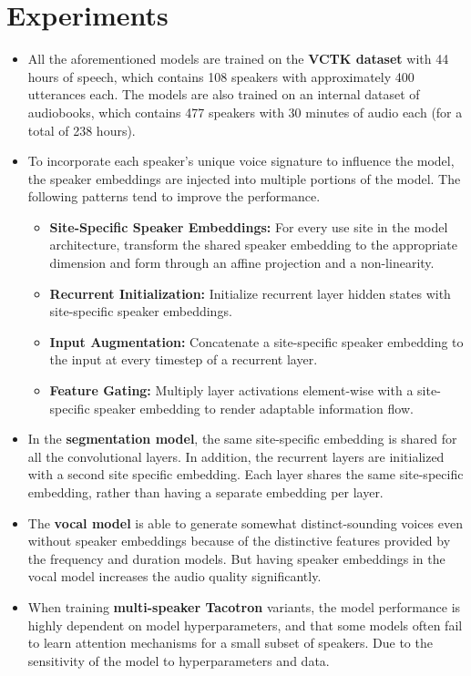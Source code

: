 \documentclass[twosided]{article}
\begin{document}
\section*{Experiments}
\begin{itemize}
    \item All the aforementioned models are trained on the \textbf{VCTK dataset} with 44 hours of speech, which contains 108 speakers with approximately 400 utterances each. The models are also trained on an internal dataset of audiobooks, which contains 477 speakers with 30 minutes of audio each (for a total of 238 hours).
    \item To incorporate each speaker’s unique voice signature to influence the model, the speaker embeddings are injected into multiple portions of the model. The following patterns tend to improve the performance.
    \begin{itemize}
        \item \textbf{Site-Specific Speaker Embeddings:} For every use site in the model architecture, transform the shared speaker embedding to the appropriate dimension and form through an affine projection and a non-linearity.
        \item \textbf{Recurrent Initialization:} Initialize recurrent layer hidden states with site-specific speaker embeddings.
        \item \textbf{Input Augmentation:} Concatenate a site-specific speaker embedding to the input at every timestep of a recurrent layer.
        \item \textbf{Feature Gating:} Multiply layer activations element-wise with a site-specific speaker embedding to render adaptable information flow.
    \end{itemize}
    \item In the \textbf{segmentation model}, the same site-specific embedding is shared for all the convolutional layers. In addition, the recurrent layers are initialized with a second site specific embedding. Each layer shares the same site-specific embedding, rather than having a separate embedding per layer.
    \item The \textbf{vocal model} is able to generate somewhat distinct-sounding voices even without speaker embeddings because of the distinctive features provided by the frequency and duration models. But having speaker embeddings in the vocal model increases the audio quality significantly.
    \item When training \textbf{multi-speaker Tacotron} variants, the model performance is highly dependent on model hyperparameters, and that some models often fail to learn attention mechanisms for a small subset of speakers. Due to the sensitivity of the model to hyperparameters and data.

\end{itemize}
\end{document}

